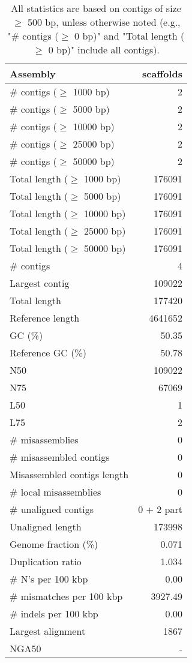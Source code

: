 \documentclass[12pt,a4paper]{article}
\begin{document}
\begin{table}[ht]
\begin{center}
\caption{All statistics are based on contigs of size $\geq$ 500 bp, unless otherwise noted (e.g., "\# contigs ($\geq$ 0 bp)" and "Total length ($\geq$ 0 bp)" include all contigs).}
\begin{tabular}{|l*{1}{|r}|}
\hline
Assembly & scaffolds \\ \hline
\# contigs ($\geq$ 1000 bp) & 2 \\ \hline
\# contigs ($\geq$ 5000 bp) & 2 \\ \hline
\# contigs ($\geq$ 10000 bp) & 2 \\ \hline
\# contigs ($\geq$ 25000 bp) & 2 \\ \hline
\# contigs ($\geq$ 50000 bp) & 2 \\ \hline
Total length ($\geq$ 1000 bp) & 176091 \\ \hline
Total length ($\geq$ 5000 bp) & 176091 \\ \hline
Total length ($\geq$ 10000 bp) & 176091 \\ \hline
Total length ($\geq$ 25000 bp) & 176091 \\ \hline
Total length ($\geq$ 50000 bp) & 176091 \\ \hline
\# contigs & 4 \\ \hline
Largest contig & 109022 \\ \hline
Total length & 177420 \\ \hline
Reference length & 4641652 \\ \hline
GC (\%) & 50.35 \\ \hline
Reference GC (\%) & 50.78 \\ \hline
N50 & 109022 \\ \hline
N75 & 67069 \\ \hline
L50 & 1 \\ \hline
L75 & 2 \\ \hline
\# misassemblies & 0 \\ \hline
\# misassembled contigs & 0 \\ \hline
Misassembled contigs length & 0 \\ \hline
\# local misassemblies & 0 \\ \hline
\# unaligned contigs & 0 + 2 part \\ \hline
Unaligned length & 173998 \\ \hline
Genome fraction (\%) & 0.071 \\ \hline
Duplication ratio & 1.034 \\ \hline
\# N's per 100 kbp & 0.00 \\ \hline
\# mismatches per 100 kbp & 3927.49 \\ \hline
\# indels per 100 kbp & 0.00 \\ \hline
Largest alignment & 1867 \\ \hline
NGA50 & - \\ \hline
\end{tabular}
\end{center}
\end{table}
\end{document}
